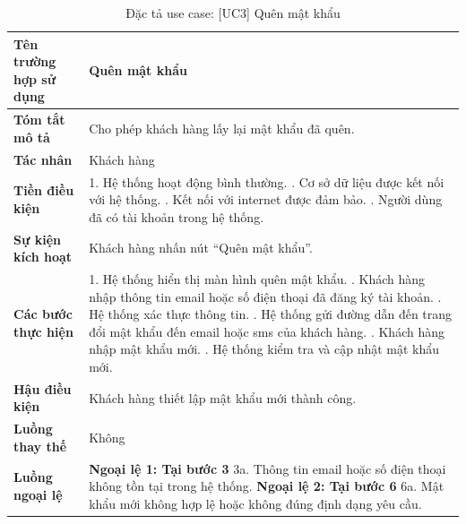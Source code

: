 \begin{longtable}{|>{\bfseries}p{4cm}|p{11.5cm}|}
\caption{Đặc tả use case: [UC3] Quên mật khẩu}
\label{tab:uc-forgot-password} \\
\hline
\textbf{Tên trường hợp sử dụng} & Quên mật khẩu \\
\hline
\textbf{Tóm tắt mô tả} & Cho phép khách hàng lấy lại mật khẩu đã quên. \\
\hline
\textbf{Tác nhân} & Khách hàng\\
\hline
\textbf{Tiền điều kiện} & 1. Hệ thống hoạt động bình thường. \newline
2. Cơ sở dữ liệu được kết nối với hệ thống. \newline
3. Kết nối với internet được đảm bảo. \newline
4. Người dùng đã có tài khoản trong hệ thống. \\
\hline
\textbf{Sự kiện kích hoạt} & Khách hàng nhấn nút “Quên mật khẩu”. \\
\hline
\textbf{Các bước thực hiện} & 1. Hệ thống hiển thị màn hình quên mật khẩu. \newline
2. Khách hàng nhập thông tin email hoặc số điện thoại đã đăng ký tài khoản. \newline
3. Hệ thống xác thực thông tin. \newline
4. Hệ thống gửi đường dẫn đến trang đổi mật khẩu đến email hoặc sms của khách hàng. \newline
5. Khách hàng nhập mật khẩu mới. \newline
6. Hệ thống kiểm tra và cập nhật mật khẩu mới. \\
\hline
\textbf{Hậu điều kiện} & Khách hàng thiết lập mật khẩu mới thành công. \\
\hline
\textbf{Luồng thay thế} & Không \\
\hline
\textbf{Luồng ngoại lệ} & \textbf{Ngoại lệ 1: Tại bước 3} \newline
3a. Thông tin email hoặc số điện thoại không tồn tại trong hệ thống. \newline
\textbf{Ngoại lệ 2: Tại bước 6} \newline
6a. Mật khẩu mới không hợp lệ hoặc không đúng định dạng yêu cầu. \\
\hline
\end{longtable}

